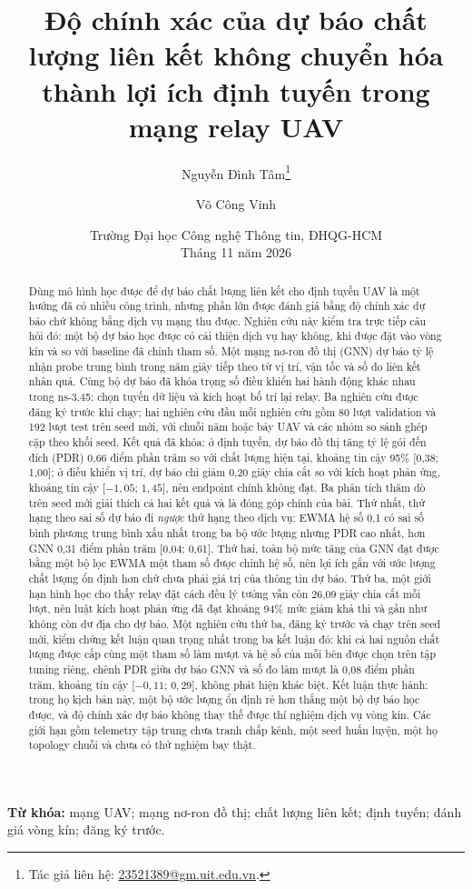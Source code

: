 \documentclass[11pt,a4paper]{article}
\title{\textbf{Độ chính xác của dự báo chất lượng liên kết
không chuyển hóa thành lợi ích định tuyến trong mạng relay UAV}}
\author{Nguyễn Đình Tâm\thanks{Tác giả liên hệ: \href{mailto:23521389@gm.uit.edu.vn}{23521389@gm.uit.edu.vn}.} \and Võ Công Vinh}
\date{Trường Đại học Công nghệ Thông tin, ĐHQG-HCM\\Tháng 11 năm 2026}
\begin{document}
\maketitle
\begin{abstract}
Dùng mô hình học được để dự báo chất lượng liên kết cho định tuyến UAV là một
hướng đã có nhiều công trình, nhưng phần lớn được đánh giá bằng độ chính xác dự
báo chứ không bằng dịch vụ mạng thu được. Nghiên cứu này kiểm tra trực tiếp câu
hỏi đó: một bộ dự báo học được có cải thiện dịch vụ hay không, khi được đặt vào
vòng kín và so với baseline đã chỉnh tham số. Một mạng nơ-ron đồ thị (GNN) dự
báo tỷ lệ nhận probe trung bình trong năm giây tiếp theo từ vị trí, vận tốc và
số đo liên kết nhân quả. Cùng bộ dự báo đã khóa trọng số điều khiển hai hành
động khác nhau trong ns-3.45: chọn tuyến dữ liệu và kích hoạt bố trí lại relay.
Ba nghiên cứu được đăng ký trước khi chạy; hai nghiên cứu đầu mỗi nghiên cứu gồm 80 lượt
validation và 192 lượt test trên seed mới, với chuỗi năm hoặc bảy UAV và các
nhóm so sánh ghép cặp theo khối seed. Kết quả đã khóa: ở định tuyến, dự báo đồ
thị tăng tỷ lệ gói đến đích (PDR) 0,66 điểm phần trăm so với chất lượng hiện
tại, khoảng tin cậy 95\% [0,38; 1,00]; ở điều khiển vị trí, dự báo chỉ giảm
0,20 giây chia cắt so với kích hoạt phản ứng, khoảng tin cậy [$-1,05$; $1,45$],
nên endpoint chính không đạt. Ba phân tích thăm dò trên seed mới giải thích cả
hai kết quả và là đóng góp chính của bài. Thứ nhất, thứ hạng theo sai số dự báo
đi \emph{ngược} thứ hạng theo dịch vụ: EWMA hệ số 0,1 có sai số bình phương
trung bình xấu nhất trong ba bộ ước lượng nhưng PDR cao nhất, hơn GNN 0,31 điểm
phần trăm [0,04; 0,61]. Thứ hai, toàn bộ mức tăng của GNN đạt được bằng một bộ
lọc EWMA một tham số được chỉnh hệ số, nên lợi ích gắn với ước lượng chất lượng
ổn định hơn chứ chưa phải giá trị của thông tin dự báo. Thứ ba, một giới hạn
hình học cho thấy relay đặt cách đều lý tưởng vẫn còn 26,09 giây chia cắt mỗi
lượt, nên luật kích hoạt phản ứng đã đạt khoảng 94\% mức giảm khả thi và gần
như không còn dư địa cho dự báo. Một nghiên cứu thứ ba, đăng ký trước và chạy
trên seed mới, kiểm chứng kết luận quan trọng nhất trong ba kết luận đó: khi cả
hai nguồn chất lượng được cấp cùng một tham số làm mượt và hệ số của mỗi bên
được chọn trên tập tuning riêng, chênh PDR giữa dự báo GNN và số đo làm mượt là
0,08 điểm phần trăm, khoảng tin cậy [$-0,11$; $0,29$], không phát hiện khác
biệt. Kết luận thực hành: trong họ kịch bản này, một
bộ ước lượng ổn định rẻ hơn thắng một bộ dự báo học được, và độ chính xác dự báo
không thay thế được thí nghiệm dịch vụ vòng kín. Các giới hạn gồm telemetry tập
trung chưa tranh chấp kênh, một seed huấn luyện, một họ topology chuỗi và chưa
có thử nghiệm bay thật.
\end{abstract}
\noindent\textbf{Từ khóa:} mạng UAV; mạng nơ-ron đồ thị; chất lượng liên kết;
định tuyến; đánh giá vòng kín; đăng ký trước.
\end{document}
